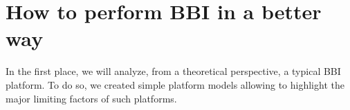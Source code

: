 
\section{How to perform BBI in a better way}
	In the first place, we will analyze, from a theoretical perspective, a typical BBI platform.
	To do so, we created simple platform models allowing to highlight the major limiting factors of such platforms.
	
